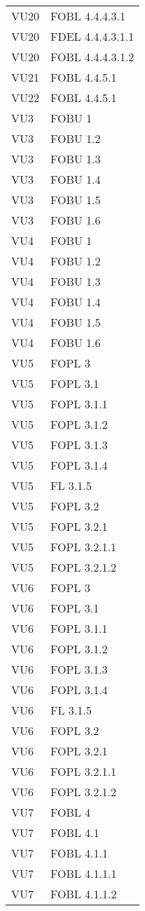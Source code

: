 \begin{longtable}{XX}
VU20&FOBL 4.4.4.3.1\\ 
VU20&FDEL 4.4.4.3.1.1\\ 
VU20&FOBL 4.4.4.3.1.2\\ 
\midrule 
VU21&FOBL 4.4.5.1\\ 
\midrule 
VU22&FOBL 4.4.5.1\\ 
\midrule 
VU3&FOBU 1\\ 
VU3&FOBU 1.2\\ 
VU3&FOBU 1.3\\ 
VU3&FOBU 1.4\\ 
VU3&FOBU 1.5\\ 
VU3&FOBU 1.6\\ 
\midrule 
VU4&FOBU 1\\ 
VU4&FOBU 1.2\\ 
VU4&FOBU 1.3\\ 
VU4&FOBU 1.4\\ 
VU4&FOBU 1.5\\ 
VU4&FOBU 1.6\\ 
\midrule 
VU5&FOPL 3\\ 
VU5&FOPL 3.1\\ 
VU5&FOPL 3.1.1\\ 
VU5&FOPL 3.1.2\\ 
VU5&FOPL 3.1.3\\ 
VU5&FOPL 3.1.4\\ 
VU5&FL 3.1.5\\ 
VU5&FOPL 3.2\\ 
VU5&FOPL 3.2.1\\ 
VU5&FOPL 3.2.1.1\\ 
VU5&FOPL 3.2.1.2\\ 
\midrule 
VU6&FOPL 3\\ 
VU6&FOPL 3.1\\ 
VU6&FOPL 3.1.1\\ 
VU6&FOPL 3.1.2\\ 
VU6&FOPL 3.1.3\\ 
VU6&FOPL 3.1.4\\ 
VU6&FL 3.1.5\\ 
VU6&FOPL 3.2\\ 
VU6&FOPL 3.2.1\\ 
VU6&FOPL 3.2.1.1\\ 
VU6&FOPL 3.2.1.2\\ 
\midrule 
VU7&FOBL 4\\ 
VU7&FOBL 4.1\\ 
VU7&FOBL 4.1.1\\ 
VU7&FOBL 4.1.1.1\\ 
VU7&FOBL 4.1.1.2\\ 

\end{longtable}
